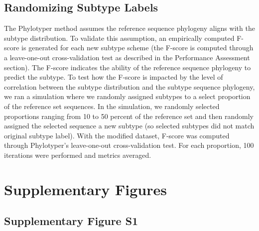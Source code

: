 \documentclass[11pt,letterpaper]{article}
\begin{document}
\subsection{Randomizing Subtype Labels}

The Phylotyper method assumes the reference sequence phylogeny aligns with the subtype distribution. To validate this assumption, an empirically computed F-score is generated for each new subtype scheme (the F-score is computed through a leave-one-out cross-validation test as described in the Performance Assessment section). The F-score indicates the ability of the reference sequence phylogeny to predict the subtype. To test how the F-score is impacted by the level of correlation between the subtype distribution and the subtype sequence phylogeny, we ran a simulation where we randomly assigned subtypes to a select proportion of the reference set sequences. In the simulation, we randomly selected proportions ranging from 10 to 50 percent of the reference set and then randomly assigned the selected sequence a new subtype (so selected subtypes did not match original subtype label). With the modified dataset, F-score was computed through Phylotyper's leave-one-out cross-validation test. For each proportion, 100 iterations were performed and metrics averaged.

\section{Supplementary Figures}

\subsection{Supplementary Figure S1}
\end{document}
